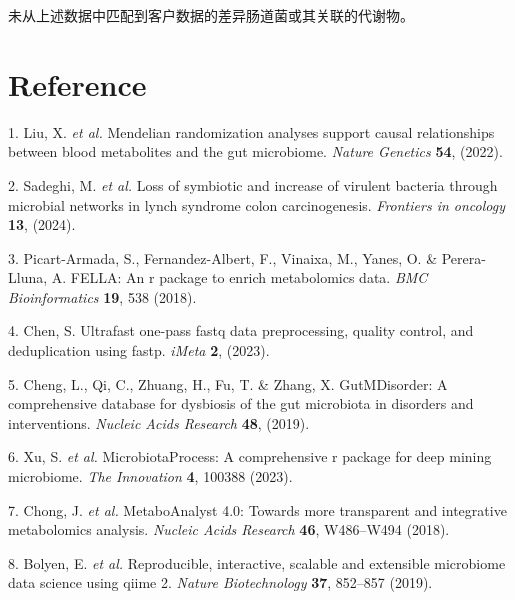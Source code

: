 \documentclass[
]{article}
\newenvironment{cslreferences}%
  {}%
  {\par}
\begin{document}
未从上述数据中匹配到客户数据的差异肠道菌或其关联的代谢物。

\hypertarget{bibliography}{%
\section*{Reference}\label{bibliography}}

\hypertarget{refs}{}
\begin{cslreferences}
\leavevmode\hypertarget{ref-MendelianRandoLiuX2022}{}%
1. Liu, X. \emph{et al.} Mendelian randomization analyses support causal relationships between blood metabolites and the gut microbiome. \emph{Nature Genetics} \textbf{54}, (2022).

\leavevmode\hypertarget{ref-LossOfSymbiotSadegh2024}{}%
2. Sadeghi, M. \emph{et al.} Loss of symbiotic and increase of virulent bacteria through microbial networks in lynch syndrome colon carcinogenesis. \emph{Frontiers in oncology} \textbf{13}, (2024).

\leavevmode\hypertarget{ref-FellaAnRPacPicart2018}{}%
3. Picart-Armada, S., Fernandez-Albert, F., Vinaixa, M., Yanes, O. \& Perera-Lluna, A. FELLA: An r package to enrich metabolomics data. \emph{BMC Bioinformatics} \textbf{19}, 538 (2018).

\leavevmode\hypertarget{ref-UltrafastOnePChen2023}{}%
4. Chen, S. Ultrafast one-pass fastq data preprocessing, quality control, and deduplication using fastp. \emph{iMeta} \textbf{2}, (2023).

\leavevmode\hypertarget{ref-GutmdisorderACheng2019}{}%
5. Cheng, L., Qi, C., Zhuang, H., Fu, T. \& Zhang, X. GutMDisorder: A comprehensive database for dysbiosis of the gut microbiota in disorders and interventions. \emph{Nucleic Acids Research} \textbf{48}, (2019).

\leavevmode\hypertarget{ref-MicrobiotaproceXuSh2023}{}%
6. Xu, S. \emph{et al.} MicrobiotaProcess: A comprehensive r package for deep mining microbiome. \emph{The Innovation} \textbf{4}, 100388 (2023).

\leavevmode\hypertarget{ref-Metaboanalyst4Chong2018}{}%
7. Chong, J. \emph{et al.} MetaboAnalyst 4.0: Towards more transparent and integrative metabolomics analysis. \emph{Nucleic Acids Research} \textbf{46}, W486--W494 (2018).

\leavevmode\hypertarget{ref-ReproducibleIBolyen2019}{}%
8. Bolyen, E. \emph{et al.} Reproducible, interactive, scalable and extensible microbiome data science using qiime 2. \emph{Nature Biotechnology} \textbf{37}, 852--857 (2019).


\end{cslreferences}
\end{document}
